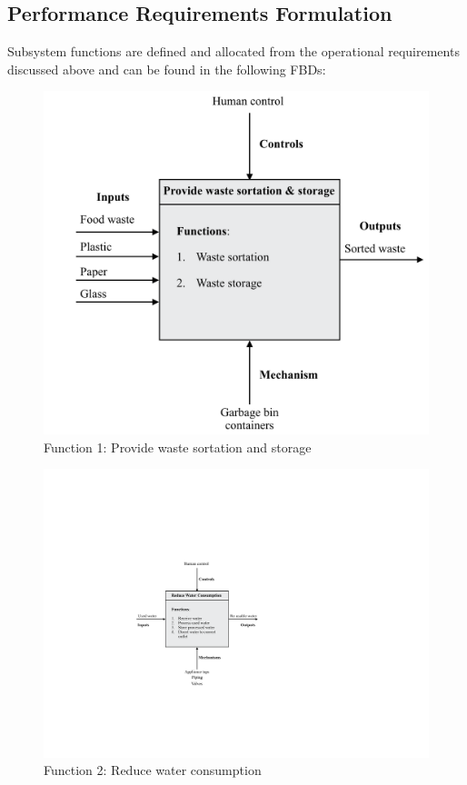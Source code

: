 \documentclass[a4paper,11pt,fleqn]{report}
\begin{document}
\subsection{Performance Requirements Formulation}
Subsystem functions are defined and allocated from the operational requirements discussed above and can be found in the following \ac{FBD}s:\\ 
%
\begin{figure}[h!]
\begin{center}
\includegraphics[scale = 0.4]{Function1.pdf}
\caption{Function 1: Provide waste sortation and storage}
\label{fig: Function1}
\end{center}
\end{figure}
%
\begin{figure}[h!]
\begin{center}
\includegraphics[scale = 0.8]{Function2.pdf}
\caption{Function 2: Reduce water consumption}
\label{fig: Function2}
\end{center}
\end{figure}
\end{document}
